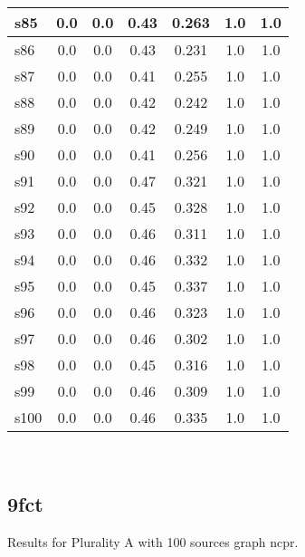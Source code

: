 \documentclass{article}
\begin{document}
\begin{tabular}{|l|c|c|c|c|c|c|}
\hline
s85 &0.0 & 0.0 & 0.43 & 0.263 & 1.0 & 1.0\\
\hline
s86 &0.0 & 0.0 & 0.43 & 0.231 & 1.0 & 1.0\\
\hline
s87 &0.0 & 0.0 & 0.41 & 0.255 & 1.0 & 1.0\\
\hline
s88 &0.0 & 0.0 & 0.42 & 0.242 & 1.0 & 1.0\\
\hline
s89 &0.0 & 0.0 & 0.42 & 0.249 & 1.0 & 1.0\\
\hline
s90 &0.0 & 0.0 & 0.41 & 0.256 & 1.0 & 1.0\\
\hline
s91 &0.0 & 0.0 & 0.47 & 0.321 & 1.0 & 1.0\\
\hline
s92 &0.0 & 0.0 & 0.45 & 0.328 & 1.0 & 1.0\\
\hline
s93 &0.0 & 0.0 & 0.46 & 0.311 & 1.0 & 1.0\\
\hline
s94 &0.0 & 0.0 & 0.46 & 0.332 & 1.0 & 1.0\\
\hline
s95 &0.0 & 0.0 & 0.45 & 0.337 & 1.0 & 1.0\\
\hline
s96 &0.0 & 0.0 & 0.46 & 0.323 & 1.0 & 1.0\\
\hline
s97 &0.0 & 0.0 & 0.46 & 0.302 & 1.0 & 1.0\\
\hline
s98 &0.0 & 0.0 & 0.45 & 0.316 & 1.0 & 1.0\\
\hline
s99 &0.0 & 0.0 & 0.46 & 0.309 & 1.0 & 1.0\\
\hline
s100 &0.0 & 0.0 & 0.46 & 0.335 & 1.0 & 1.0\\
\hline
\end{tabular}\\

\newpage

\subsection{9fct}

\noindent Results for Plurality A with 100 sources graph ncpr.
\end{document}
